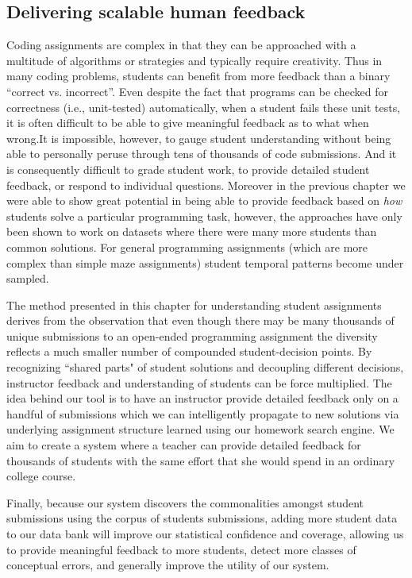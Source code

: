\subsection{Delivering scalable human feedback}

Coding assignments are complex in that they can 
be approached with a multitude of algorithms or strategies and typically require creativity. 
Thus in many coding problems, students can benefit from more feedback than a binary ``correct vs. incorrect''. Even despite the fact that programs can be checked for correctness (i.e., unit-tested) automatically, when a student fails these unit tests, it is often difficult to be able to give meaningful feedback as to what when wrong.It is impossible, however, to gauge student understanding without being able to personally peruse through  tens of thousands of code submissions.
And it is consequently difficult to grade student work, to provide detailed student feedback, or respond to individual questions. Moreover in the previous chapter we were able to show great potential in being able to provide feedback based on \emph{how} students solve a particular programming task, however, the approaches have only been shown to work on datasets where there were many more students than common solutions. For general programming assignments (which are more complex than simple maze assignments) student temporal patterns become under sampled. 


The method presented in this chapter for understanding student assignments derives from the observation that even though there may be many thousands of unique submissions to an open-ended programming assignment the diversity reflects a much smaller number of compounded student-decision points. By recognizing ``shared parts" of student solutions and decoupling different decisions, instructor feedback and understanding of students can be force multiplied. The idea behind our tool is to have an instructor provide detailed feedback only on a handful of submissions which we can intelligently propagate to new solutions via underlying assignment structure learned using our homework search engine. We aim to create a system where a teacher can provide detailed 
feedback for thousands of students with the same effort that she would spend in an ordinary college course.


 Finally, because our system discovers the commonalities amongst student submissions using the corpus of students submissions, adding more student data to our data bank
 will improve our statistical confidence and coverage, 
 allowing us to provide meaningful feedback to more students, detect more classes of conceptual errors, and generally improve the utility of our system.

